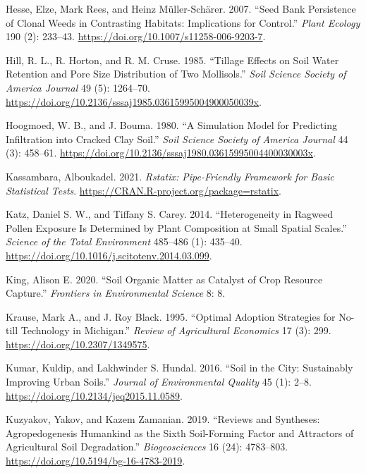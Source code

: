 \documentclass[
  12pt,
]{article}
\newlength{\cslhangindent}
\newlength{\cslentryspacingunit} %
\newenvironment{CSLReferences}[2] %
 {%
  \setlength{\parindent}{0pt}
  \ifodd #1
  \let\oldpar\par
  \def\par{\hangindent=\cslhangindent\oldpar}
  \fi
  \setlength{\parskip}{#2\cslentryspacingunit}
 }%
 {}
\begin{document}
\begin{CSLReferences}{1}{0}
\leavevmode{}%
Hesse, Elze, Mark Rees, and Heinz Müller-Schärer. 2007. {``Seed Bank Persistence of Clonal Weeds in Contrasting Habitats: Implications for Control.''} \emph{Plant Ecology} 190 (2): 233--43. \url{https://doi.org/10.1007/s11258-006-9203-7}.

\leavevmode{}%
Hill, R. L., R. Horton, and R. M. Cruse. 1985. {``Tillage {Effects} on {Soil Water Retention} and {Pore Size Distribution} of {Two Mollisols}.''} \emph{Soil Science Society of America Journal} 49 (5): 1264--70. \url{https://doi.org/10.2136/sssaj1985.03615995004900050039x}.

\leavevmode{}%
Hoogmoed, W. B., and J. Bouma. 1980. {``A {Simulation Model} for {Predicting Infiltration} into {Cracked Clay Soil}.''} \emph{Soil Science Society of America Journal} 44 (3): 458--61. \url{https://doi.org/10.2136/sssaj1980.03615995004400030003x}.

\leavevmode{}%
Kassambara, Alboukadel. 2021. \emph{Rstatix: Pipe-Friendly Framework for Basic Statistical Tests}. \url{https://CRAN.R-project.org/package=rstatix}.

\leavevmode{}%
Katz, Daniel S. W., and Tiffany S. Carey. 2014. {``Heterogeneity in Ragweed Pollen Exposure Is Determined by Plant Composition at Small Spatial Scales.''} \emph{Science of the Total Environment} 485--486 (1): 435--40. \url{https://doi.org/10.1016/j.scitotenv.2014.03.099}.

\leavevmode{}%
King, Alison E. 2020. {``Soil {Organic Matter} as {Catalyst} of {Crop Resource Capture}.''} \emph{Frontiers in Environmental Science} 8: 8.

\leavevmode{}%
Krause, Mark A., and J. Roy Black. 1995. {``Optimal {Adoption Strategies} for {No-till Technology} in {Michigan}.''} \emph{Review of Agricultural Economics} 17 (3): 299. \url{https://doi.org/10.2307/1349575}.

\leavevmode{}%
Kumar, Kuldip, and Lakhwinder S. Hundal. 2016. {``Soil in the {City}: {Sustainably Improving Urban Soils}.''} \emph{Journal of Environmental Quality} 45 (1): 2--8. \url{https://doi.org/10.2134/jeq2015.11.0589}.

\leavevmode{}%
Kuzyakov, Yakov, and Kazem Zamanian. 2019. {``Reviews and Syntheses: {Agropedogenesis} \textendash{} Humankind as the Sixth Soil-Forming Factor and Attractors of Agricultural Soil Degradation.''} \emph{Biogeosciences} 16 (24): 4783--803. \url{https://doi.org/10.5194/bg-16-4783-2019}.


\end{CSLReferences}
\end{document}

